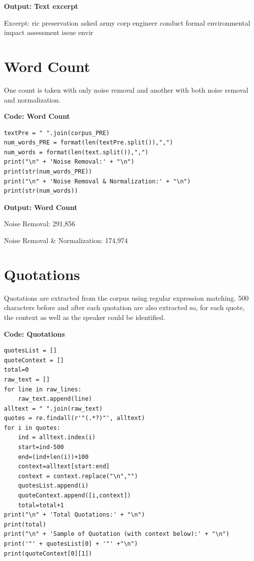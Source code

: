 \textbf{Output: Text excerpt}

\begin{footnotesize}

Excerpt:
ric preservation asked army corp engineer conduct formal environmental impact assessment issue envir
\end{footnotesize}


\section{Word Count}
One count is taken with only noise removal and another with both noise removal and normalization.

\textbf{Code: Word Count}

\begin{lstlisting}
textPre = " ".join(corpus_PRE)
num_words_PRE = format(len(textPre.split()),",")
num_words = format(len(text.split()),",")
print("\n" + 'Noise Removal:' + "\n")  
print(str(num_words_PRE))
print("\n" + 'Noise Removal & Normalization:' + "\n")  
print(str(num_words))
\end{lstlisting}

\textbf{Output: Word Count}

\begin{footnotesize}

Noise Removal:
291,856

Noise Removal \& Normalization:
174,974

\end{footnotesize}






\section{Quotations}
Quotations are extracted from the corpus using regular expression matching. 500 characters before and after each quotation are also extracted so, for each quote, the context as well as the speaker could be identified.

\textbf{Code: Quotations}

\begin{lstlisting}
quotesList = []
quoteContext = []
total=0
raw_text = []
for line in raw_lines:
    raw_text.append(line)
alltext = " ".join(raw_text)
quotes = re.findall(r'"(.*?)"', alltext)
for i in quotes:
    ind = alltext.index(i)
    start=ind-500
    end=(ind+len(i))+100
    context=alltext[start:end]
    context = context.replace("\n","")
    quotesList.append(i)
    quoteContext.append([i,context])
    total=total+1
print("\n" + 'Total Quotations:' + "\n") 
print(total)
print("\n" + 'Sample of Quotation (with context below):' + "\n") 
print('"' + quotesList[0] + '"' +"\n")
print(quoteContext[0][1])
\end{lstlisting}

